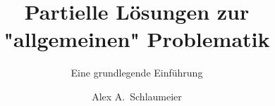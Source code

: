 \documentclass[type=master,degree=engineering,theme=default,language=german,titlelanguage=german,smartquotes=true,aiusage=detailed]{hgbthesis}
\begin{document}


\title{Partielle Lösungen zur "allgemeinen" Problematik}
\subtitle{Eine grundlegende Einführung}
\author{Alex A.\ Schlaumeier}







\frontmatter                                       %

\maketitle
\tableofcontents

		
			

\mainmatter                             %









\end{document}
